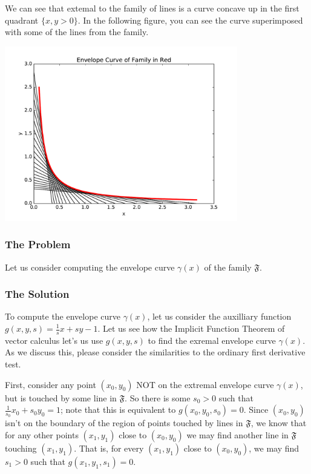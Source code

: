 We can see that extemal to the family of lines is a curve concave up in the first quadrant \(\{x, y > 0\}\). In the following figure, you can see the curve superimposed with some of the lines from the family.

\includegraphics[width = 4.0in]{multiVarDiffCalc/hyperbolaEnvelope.pdf}

\subsubsection*{The Problem}
Let us consider computing the envelope curve \(\gamma(x)\) of the family \(\mathfrak F\). 

\subsubsection*{The Solution}

To compute the envelope curve \(\gamma(x)\), let us consider the auxilliary function
\(g(x,y,s) = \frac{1}{s} x + s y - 1\). Let us see how the Implicit Function Theorem of vector calculus let's us
use \(g(x,y, s)\) to find the exremal envelope curve \(\gamma(x)\). As we discuss this, please consider the similarities to the ordinary first derivative test.

First, consider any point \((x_0, y_0)\) NOT on the extremal envelope curve \(\gamma(x)\), but is touched by some line in \(\mathfrak F\). 
So there is some \(s_0 > 0\) such that \(\frac{1}{s_0} x_0 + s_0 y_0 = 1\); note that this is equivalent to \(g(x_0, y_0, s_0) = 0\). 
Since \((x_0, y_0)\) isn't on the boundary of the region of points touched by lines in \(\mathfrak F\), we know that for any other points \((x_1, y_1)\) close to \((x_0, y_0)\) we may find another line in \(\mathfrak F\) touching \((x_1, y_1)\). 
That is, for every \((x_1, y_1)\) close to \((x_0, y_0)\), we may find \(s_1 > 0\) such that \(g(x_1, y_1, s_1) = 0\).  

